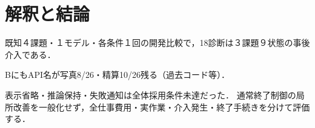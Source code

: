 \documentclass[letter]{ieicej}
\begin{document}



\section{解釈と結論}
既知４課題・１モデル・各条件１回の開発比較で，18診断は３課題９状態の事後介入である．

BにもAPI名が写真8/26・精算10/26残る（過去コード等）．

表示省略・推論保持・失敗通知は全体採用条件未達だった．
通常終了制御の局所改善を一般化せず，全仕事費用・実作業・介入発生・終了手続きを分けて評価する．



\label{PreviewLastBodyPage}
\end{document}
